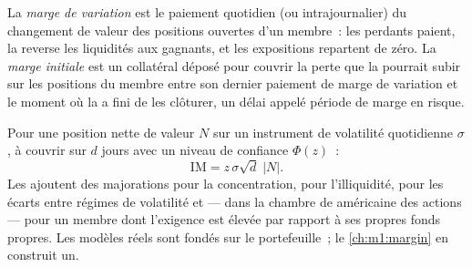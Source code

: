 \begin{definition}\label{def:m1:clearing-and-settlement:margin}
La \emph{marge de variation} est le paiement quotidien (ou intrajournalier)
du changement de valeur des positions ouvertes d'un membre~: les perdants paient, la
 reverse les liquidités aux gagnants, et les expositions repartent de zéro.
La \emph{marge initiale} est un collatéral déposé pour couvrir
la perte que la  pourrait subir sur les positions du membre entre son
dernier paiement de marge de variation et le moment où la  a fini de
les clôturer, un délai appelé période de marge en risque.
\end{definition}

\begin{method}\label{met:m1:clearing-and-settlement:im}
Pour une position nette de valeur $N$ sur un instrument de volatilité quotidienne
$\sigma$, à couvrir sur $d$ jours avec un niveau de confiance $\Phi(z)$~:
\[
\mathrm{IM} = z\,\sigma\sqrt{d}\;|N| .
\]
Les  ajoutent des majorations pour la concentration, pour l'illiquidité, pour les écarts entre
régimes de volatilité et --- dans la chambre de  américaine des actions --- pour un membre
dont l'exigence est élevée par rapport à ses propres fonds propres. Les modèles réels sont
fondés sur le portefeuille~; le \cref{ch:m1:margin} en construit un.
\end{method}

